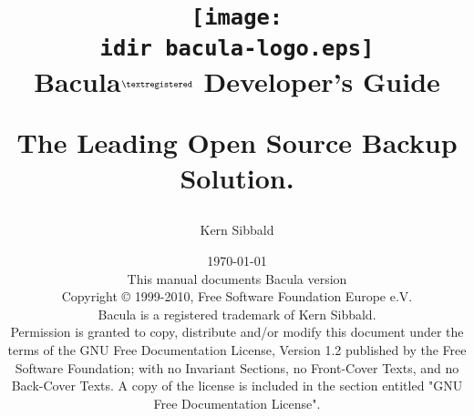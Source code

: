 \parskip 10pt
\parindent 0pt

\title{\texttt{[image: \\idir bacula-logo.eps]} \\ \bigskip
  \Huge{Bacula}$^{\normalsize \textregistered}$ \Huge{Developer's Guide}
  \begin{center}
   \large{The Leading Open Source Backup Solution. }
  \end{center}
}


\author{Kern Sibbald}
\date{\vspace{1.0in}\today \\
      This manual documents Bacula version  \\
      \vspace{0.2in}
      Copyright {\copyright} 1999-2010, Free Software Foundation Europe
      e.V. \\
      Bacula {\textregistered}  is a registered trademark of Kern Sibbald.\\
      \vspace{0.2in}
  Permission is granted to copy, distribute and/or modify this document under the terms of the
  GNU Free Documentation License, Version 1.2 published by the Free Software Foundation;
  with no Invariant Sections, no Front-Cover Texts, and no Back-Cover Texts.
  A copy of the license is included in the section entitled "GNU Free Documentation License".
}

\maketitle
